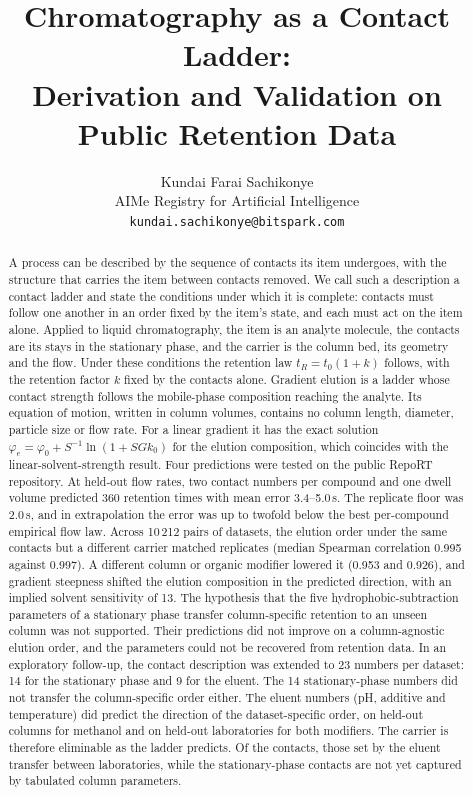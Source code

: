 \documentclass[11pt,a4paper]{article}
\title{\textbf{Chromatography as a Contact Ladder:\\Derivation and Validation on Public Retention Data}}
\author{
Kundai Farai Sachikonye\\
AIMe Registry for Artificial Intelligence\\
\texttt{kundai.sachikonye@bitspark.com}
}
\date{}
\theoremstyle{definition}
\theoremstyle{remark}
\begin{document}
\maketitle

\begin{abstract}
\noindent
A process can be described by the sequence of contacts its item undergoes, with the structure that carries the item between contacts removed.
We call such a description a contact ladder and state the conditions under which it is complete: contacts must follow one another in an order fixed by the item's state, and each must act on the item alone.
Applied to liquid chromatography, the item is an analyte molecule, the contacts are its stays in the stationary phase, and the carrier is the column bed, its geometry and the flow.
Under these conditions the retention law $t_R=t_0(1+k)$ follows, with the retention factor $k$ fixed by the contacts alone.
Gradient elution is a ladder whose contact strength follows the mobile-phase composition reaching the analyte.
Its equation of motion, written in column volumes, contains no column length, diameter, particle size or flow rate.
For a linear gradient it has the exact solution $\varphi_e=\varphi_0+S^{-1}\ln(1+SGk_0)$ for the elution composition, which coincides with the linear-solvent-strength result.
Four predictions were tested on the public RepoRT repository.
At held-out flow rates, two contact numbers per compound and one dwell volume predicted 360 retention times with mean error 3.4--5.0\,s.
The replicate floor was 2.0\,s, and in extrapolation the error was up to twofold below the best per-compound empirical flow law.
Across 10\,212 pairs of datasets, the elution order under the same contacts but a different carrier matched replicates (median Spearman correlation 0.995 against 0.997).
A different column or organic modifier lowered it (0.953 and 0.926), and gradient steepness shifted the elution composition in the predicted direction, with an implied solvent sensitivity of 13.
The hypothesis that the five hydrophobic-subtraction parameters of a stationary phase transfer column-specific retention to an unseen column was not supported.
Their predictions did not improve on a column-agnostic elution order, and the parameters could not be recovered from retention data.
In an exploratory follow-up, the contact description was extended to 23 numbers per dataset: 14 for the stationary phase and 9 for the eluent.
The 14 stationary-phase numbers did not transfer the column-specific order either.
The eluent numbers (pH, additive and temperature) did predict the direction of the dataset-specific order, on held-out columns for methanol and on held-out laboratories for both modifiers.
The carrier is therefore eliminable as the ladder predicts.
Of the contacts, those set by the eluent transfer between laboratories, while the stationary-phase contacts are not yet captured by tabulated column parameters.
\end{abstract}
\end{document}
